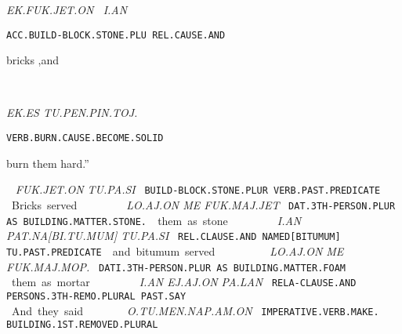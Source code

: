 {{\it EK.FUK.JET.ON~			I.AN }

{\tt ACC.BUILD-BLOCK.STONE.PLU 	REL.CAUSE.AND		 }

bricks			,and 	 

\drie
  

\ek\es~\tu\pen\pin\toj\period

{\it EK.ES TU.PEN.PIN.TOJ.}

{\tt VERB.BURN.CAUSE.BECOME.SOLID}

burn them			hard.” 
\drie


\fuk\jet\on ~ \tu\pa\si

{\it FUK.JET.ON			TU.PA.SI			 }

{\tt BUILD-BLOCK.STONE.PLUR          VERB.PAST.PREDICATE	 }

Bricks 				served 				 
\drie

\lo\aj\on ~ \me ~\fuk\maj\jet

{\it LO.AJ.ON		ME	FUK.MAJ.JET }

{\tt DAT.3TH-PERSON.PLUR AS	BUILDING.MATTER.STONE. }

them			as 	stone	 


\drie
  

\an ~ \pat\na\cartouche{\Atlanpi\tu\mum} ~ \tu\pa\si

{\it I.AN	PAT.NA[BI.TU.MUM]	TU.PA.SI }

{\tt REL.CLAUSE.AND	NAMED[BITUMUM]	TU.PAST.PREDICATE }

and	bitumum 		served  
\drie


  

\lo\aj\on ~\me ~\fuk\maj\mop\period

{\it LO.AJ.ON			ME	FUK.MAJ.MOP. }

{\tt DATI.3TH-PERSON.PLUR               AS	BUILDING.MATTER.FOAM }

them				as 	mortar. 

\drie
  

\Atlani\an ~ \ej\aj\on ~ \pa\lan

{\it I.AN			EJ.AJ.ON			PA.LAN }

{\tt RELA-CLAUSE.AND          PERSONS.3TH-REMO.PLURAL 	PAST.SAY }

And 			they 				said  

\drie

  

\Atlano\tu\men\nap\am\on

{\it O.TU.MEN.NAP.AM.ON }

{\tt IMPERATIVE.VERB.MAKE. BUILDING.1ST.REMOVED.PLURAL	 }

}
